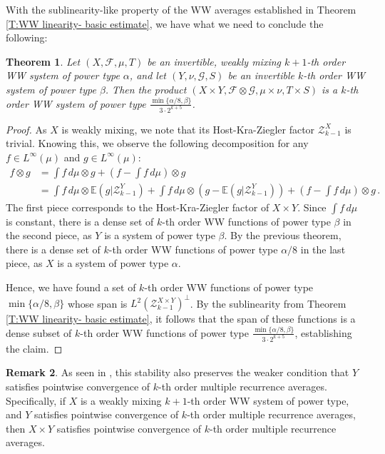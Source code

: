 \documentclass[11pt, oneside]{amsart}   	%
\newcommand{\1}{\mathbbm{1}}
\newtheorem{theorem}{Theorem}[section]
\theoremstyle{definition}
\newtheorem{remark}[theorem]{Remark}
\begin{document}
With the sublinearity-like property of the WW averages established in Theorem \ref{T:WW linearity- basic estimate}, we have what we need to conclude the following:

\begin{theorem}
Let $(X, \mathcal{F}, \mu, T)$ be an invertible, weakly mixing $k+1$-th order WW system of power type $\alpha$, and let $(Y, \nu, \mathcal{G}, S)$ be an invertible $k$-th order WW system of power type $\beta$. Then the product $(X\times Y, \mathcal{F} \otimes \mathcal{G}, \mu \times \nu, T \times S)$ is a $k$-th order WW system of power type $\frac{\min\{\alpha/8, \beta\}}{3\cdot 2^{k+5}}$.
\end{theorem}

\begin{proof}
As $X$ is weakly mixing, we note that its Host-Kra-Ziegler factor $\mathcal{Z}_{k-1}^X$ is trivial. Knowing this, we observe the following decomposition for any $f\in L^\infty(\mu)$ and $g\in L^\infty(\mu)$:
\begin{align*}
f \otimes g &= \int f \, d\mu \otimes g + \left(f - \int f\, d\mu\right) \otimes g \\
&= \int f \, d\mu \otimes \mathbb{E}(g | \mathcal{Z}_{k-1}^Y) + \int f \, d\mu \otimes \left(g - \mathbb{E}(g | \mathcal{Z}_{k-1}^Y) \right)+ \left(f - \int f\, d\mu\right) \otimes g\, .
\end{align*}
The first piece corresponds to the Host-Kra-Ziegler factor of $X \times Y$. Since $\int f \, d\mu$ is constant, there is a dense set of $k$-th order WW functions of power type $\beta$ in the second piece, as $Y$ is a system of power type $\beta$. By the previous theorem, there is a dense set of $k$-th order WW functions of power type $\alpha/8$ in the last piece, as $X$ is a system of power type $\alpha$.

Hence, we have found a set of $k$-th order WW functions of power type $\min\{\alpha/8, \beta\}$ whose span is $L^2(\mathcal{Z}_{k-1}^{X \times Y})^\perp$. By the sublinearity from Theorem \ref{T:WW linearity- basic estimate}, it follows that the span of these functions is a dense subset of $k$-th order WW functions of power type $\frac{\min\{\alpha/8, \beta\}}{3\cdot 2^{k+5}}$, establishing the claim.
\end{proof}

\begin{remark}
As seen in \cite{assani2024higherorderwienerwintnersystems}, this stability also preserves the weaker condition that $Y$ satisfies pointwise convergence of $k$-th order multiple recurrence averages. Specifically, if $X$ is a weakly mixing $k+1$-th order WW system of power type, and $Y$ satisfies pointwise convergence of $k$-th order multiple recurrence averages, then $X\times Y$ satisfies pointwise convergence of $k$-th order multiple recurrence averages.
\end{remark}
\end{document}
